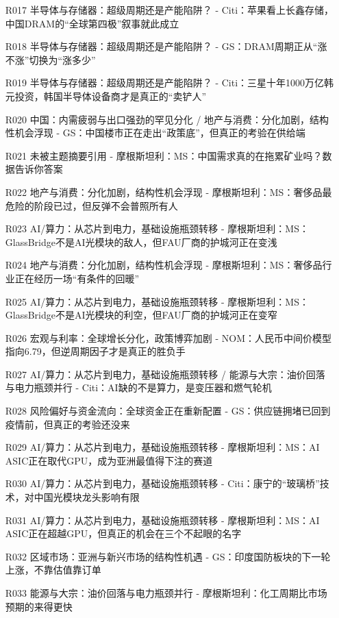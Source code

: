 \documentclass[11pt]{ctexart}
\begin{document}
\begin{itemize}
  \item [R017] 半导体与存储器：超级周期还是产能陷阱？ - Citi：苹果看上长鑫存储，中国DRAM的“全球第四极”叙事就此成立
  \item [R018] 半导体与存储器：超级周期还是产能陷阱？ - GS：DRAM周期正从“涨不涨”切换为“涨多少”
  \item [R019] 半导体与存储器：超级周期还是产能陷阱？ - Citi：三星十年1000万亿韩元投资，韩国半导体设备商才是真正的“卖铲人”
  \item [R020] 中国：内需疲弱与出口强劲的罕见分化 / 地产与消费：分化加剧，结构性机会浮现 - GS：中国楼市正在走出“政策底”，但真正的考验在供给端
  \item [R021] 未被主题摘要引用 - 摩根斯坦利：MS：中国需求真的在拖累矿业吗？数据告诉你答案
  \item [R022] 地产与消费：分化加剧，结构性机会浮现 - 摩根斯坦利：MS：奢侈品最危险的阶段已过，但反弹不会普照所有人
  \item [R023] AI/算力：从芯片到电力，基础设施瓶颈转移 - 摩根斯坦利：MS：GlassBridge不是AI光模块的敌人，但FAU厂商的护城河正在变浅
  \item [R024] 地产与消费：分化加剧，结构性机会浮现 - 摩根斯坦利：MS：奢侈品行业正在经历一场“有条件的回暖”
  \item [R025] AI/算力：从芯片到电力，基础设施瓶颈转移 - 摩根斯坦利：MS：GlassBridge不是AI光模块的利空，但FAU厂商的护城河正在变窄
  \item [R026] 宏观与利率：全球增长分化，政策博弈加剧 - NOM：人民币中间价模型指向6.79，但逆周期因子才是真正的胜负手
  \item [R027] AI/算力：从芯片到电力，基础设施瓶颈转移 / 能源与大宗：油价回落与电力瓶颈并行 - Citi：AI缺的不是算力，是变压器和燃气轮机
  \item [R028] 风险偏好与资金流向：全球资金正在重新配置 - GS：供应链拥堵已回到疫情前，但真正的考验还没来
  \item [R029] AI/算力：从芯片到电力，基础设施瓶颈转移 - 摩根斯坦利：MS：AI ASIC正在取代GPU，成为亚洲最值得下注的赛道
  \item [R030] AI/算力：从芯片到电力，基础设施瓶颈转移 - Citi：康宁的“玻璃桥”技术，对中国光模块龙头影响有限
  \item [R031] AI/算力：从芯片到电力，基础设施瓶颈转移 - 摩根斯坦利：MS：AI ASIC正在超越GPU，但真正的机会在三个不起眼的名字
  \item [R032] 区域市场：亚洲与新兴市场的结构性机遇 - GS：印度国防板块的下一轮上涨，不靠估值靠订单
  \item [R033] 能源与大宗：油价回落与电力瓶颈并行 - 摩根斯坦利：化工周期比市场预期的来得更快

\end{itemize}
\end{document}
